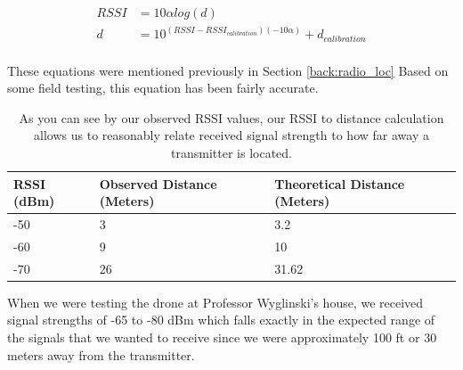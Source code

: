  \begin{align}
\label{eq:rss} RSSI &= 10\alpha log(d) \\ 
d &= 10^{(RSSI-RSSI_{calibration})(-10\alpha)} + d_{calibration} \label{eq:rss_dist}
\end{align}\\
These equations were mentioned previously in Section \ref{back:radio_loc}
Based on some field testing, this equation has been fairly accurate.\par

\begin{table}[ht]
\centering
\label{table:RSSI_Results}
\begin{tabular}{|l|l|l|} \hline
  RSSI (dBm) & Observed Distance (Meters) & Theoretical Distance (Meters) \\ \hline
  -50 & 3 & 3.2 \\
  -60 & 9 & 10 \\
  -70 & 26 & 31.62 \\ \hline
\end{tabular}
\caption{As you can see by our observed RSSI values, our RSSI to distance calculation allows us to reasonably relate received signal strength to how far away a transmitter is located.}
\end{table}\par

When we were testing the drone at Professor Wyglinski’s house, we received signal strengths of -65 to -80 dBm which falls exactly in the expected range of the signals that we wanted to receive since we were approximately 100 ft or 30 meters away from the transmitter. 

